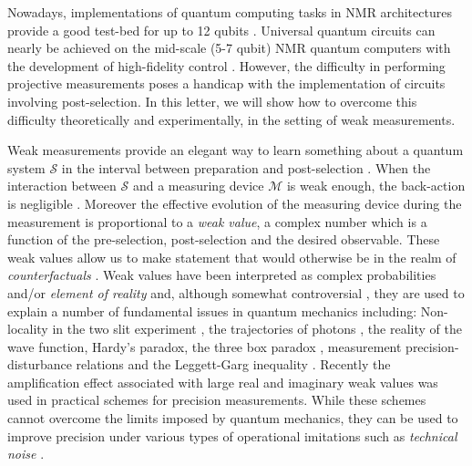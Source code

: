 \documentclass[aps,pra,12pt,onecolumn,showpacs,superscriptaddress,floatfix,footinbib,subfigure]{revtex4}
\def\es{{\mathcal{S}}}
\def\md{{\mathcal{M}}}
\begin{document}
Nowadays, implementations of quantum computing tasks in NMR architectures provide a good test-bed for up to 12 qubits  \cite{Negrevergne2006}.  Universal quantum circuits can nearly be achieved on the mid-scale (5-7 qubit) NMR quantum computers with the development of high-fidelity control \cite{NMRRsoc}. However, the difficulty in performing  projective measurements poses a  handicap with the implementation of  circuits involving  post-selection. In this letter,  we will show how to overcome this  difficulty theoretically and experimentally, in the setting of weak measurements.

Weak measurements provide an elegant way to learn something about a quantum system $\es$  in the interval between preparation and post-selection \cite{Aharonov1991}. When the interaction between $\es$ and a measuring device $\md$ is weak enough, the back-action is negligible \cite{Tollaksen2010}. Moreover the effective evolution of the measuring device during the measurement is proportional to a \emph{weak value}, a complex number which is a function of the pre-selection, post-selection and the desired observable. These weak values allow us to make statement that would otherwise be in the realm of \emph{counterfactuals} \cite{Aharonov2002,Molmer2001}. Weak values have been interpreted  as complex probabilities \cite{Hofmann2013} and/or  \emph{element of reality} \cite{Vaidman1996} and, although somewhat controversial \cite{Peres1989, Aharonov1989, Leggett1989}, they are  used to explain a number of fundamental issues in quantum mechanics including: Non-locality in the two slit experiment \cite{Tollaksen2010}, the trajectories of photons  \cite{Kocsis2011}, the reality of the wave function\cite{Lundeen2011}, Hardy's paradox\cite{Aharonov2002,Molmer2001,Lundeen2009}, the three box paradox \cite{Aharonov1991,Vaidman1996,Resch2004},   measurement precision-disturbance relations  \cite{Rozema2012,Lund2010} and the Leggett-Garg inequality \cite{Goggin2011,Williams2008,Groen2013}.  Recently the amplification effect associated with large real and imaginary weak values was  used in   practical schemes for precision measurements.  While these schemes  cannot  overcome the limits imposed by quantum mechanics, they can be used to improve precision under  various types of operational imitations  such as \emph{technical noise} \cite{Jordan2013}.
\end{document}
